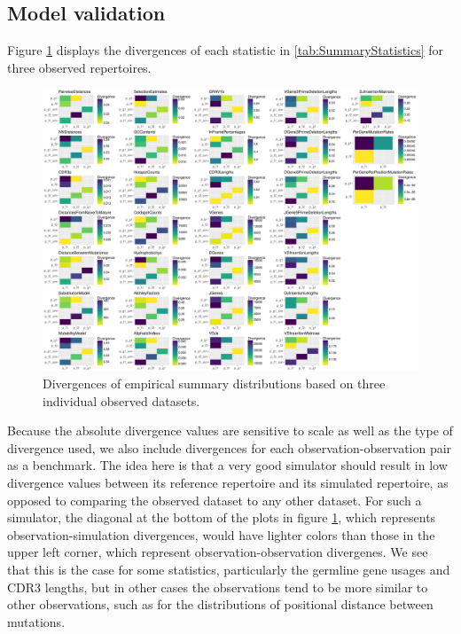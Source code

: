 \documentclass{article}
\begin{document}
\subsection*{Model validation}

Figure \ref{fig:SimObs} displays the divergences of each statistic in \ref{tab:SummaryStatistics} for three observed repertoires.
\begin{figure}
    \includegraphics[width=\linewidth]{Figures/sim_obs.pdf}
    \caption{Divergences of empirical summary distributions based on three individual observed datasets.}
    \label{fig:SimObs}
\end{figure}
Because the absolute divergence values are sensitive to scale as well as the type of divergence used, we also include divergences for each observation-observation pair as a benchmark.
The idea here is that a very good simulator should result in low divergence values between its reference repertoire and its simulated repertoire, as opposed to comparing the observed dataset to any other dataset.
For such a simulator, the diagonal at the bottom of the plots in figure \ref{fig:SimObs}, which represents observation-simulation divergences, would have lighter colors than those in the upper left corner, which represent observation-observation divergenes.
We see that this is the case for some statistics, particularly the germline gene usages and CDR3 lengths, but in other cases the observations tend to be more similar to other observations, such as for the distributions of positional distance between mutations.
\end{document}
